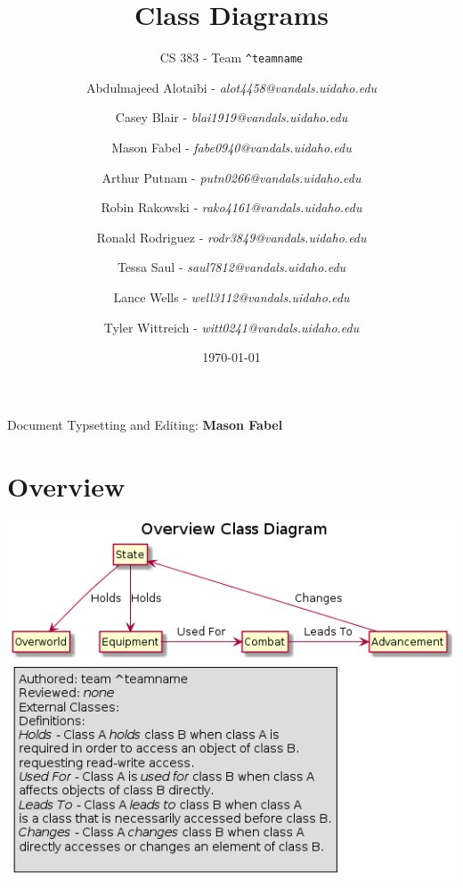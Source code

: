 \documentclass[12pt]{article}
\title{Class Diagrams}
\subtitle{CS 383 - Team \texttt{\textasciicircum teamname}}
\date{\today}
\author{
Abdulmajeed Alotaibi - \textit{alot4458@vandals.uidaho.edu} \\
\and Casey Blair - \textit{blai1919@vandals.uidaho.edu} \\
\and Mason Fabel - \textit{fabe0940@vandals.uidaho.edu} \\
\and Arthur Putnam - \textit{putn0266@vandals.uidaho.edu} \\
\and Robin Rakowski - \textit{rako4161@vandals.uidaho.edu} \\
\and Ronald Rodriguez - \textit{rodr3849@vandals.uidaho.edu} \\
\and Tessa Saul - \textit{saul7812@vandals.uidaho.edu} \\
\and Lance Wells - \textit{well3112@vandals.uidaho.edu} \\
\and Tyler Wittreich - \textit{witt0241@vandals.uidaho.edu} \\
}
\begin{document}
\maketitle

\tableofcontents
Document Typsetting and Editing: \textbf{Mason Fabel}
\clearpage

\section{Overview}
\includegraphics[width=\textwidth]{overview.png}
\end{document}

